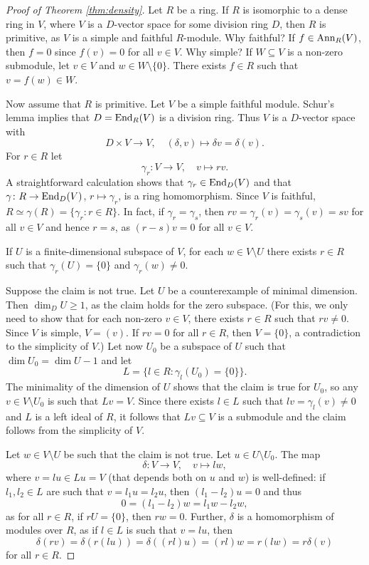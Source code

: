 \begin{proof}[Proof of Theorem \ref{thm:density}]
    Let $R$ be a ring. 
	If $R$ is isomorphic to a dense ring in $V$, where
	$V$ is a $D$-vector space for some division ring $D$, then $R$
	is primitive, as $V$ is a simple and faithful $R$-module. Why faithful? If 
	$f\in\operatorname{Ann}_R(V)$, then $f=0$ since $f(v)=0$ for all $v\in V$. Why simple? 
	If $W\subseteq V$ is a non-zero submodule, let $v\in V$ and $w\in
	W\setminus\{0\}$. There exists $f\in R$ such that $v=f(w)\in W$. 

	Now assume that $R$ is primitive. Let $V$ be a simple faithful module.
	Schur's lemma implies that $D=\operatorname{End}_R(V)$ is a division ring. Thus $V$ is
	a $D$-vector space with 
	\[
	D\times V\to V,\quad
	(\delta,v)\mapsto \delta v=\delta(v).
	\]
	For $r\in R$ let  
	\[
		\gamma_r\colon V\to V,\quad
		v\mapsto rv.
	\]
	A straightforward calculation shows that $\gamma_r\in\operatorname{End}_D(V)$ and that
    $\gamma\colon R\to\operatorname{End}_D(V)$,
	$r\mapsto\gamma_r$, is a ring homomorphism. Since $V$ is faithful,
	$R\simeq\gamma(R)=\{\gamma_r:r\in R\}$. In fact, if $\gamma_r=\gamma_s$, then 
	$rv=\gamma_r(v)=\gamma_s(v)=sv$ for all $v\in V$ and hence $r=s$, as
	$(r-s)v=0$ for all $v\in V$.

	\begin{claim}
		If $U$ is a finite-dimensional subspace of $V$, 
		for each $w\in V\setminus U$ there exists $r\in R$ such that 
		$\gamma_r(U)=\{0\}$ and $\gamma_r(w)\ne0$.
	\end{claim}

	Suppose the claim is not true. Let $U$ be a counterexample of minimal  
	dimension. Then
	$\dim_DU\geq1$, as the claim holds for the zero subspace. (For this, we only
        need to show that for each non-zero $v\in V$, there exists $r\in R$ such that $rv\ne 0$. 
        Since $V$ is simple, $V=(v)$. If $rv=0$ for all $r\in R$, then 
        $V=\{0\}$, a contradiction to the simplicity of $V$.) Let now 
	$U_0$ be a subspace of $U$ such that 
	$\dim U_0=\dim U-1$ and let 
	\[
		L=\{l\in R:\gamma_l(U_0)=\{0\}\}.
	\]
	The minimality of the dimension of $U$ shows that the claim is true for $U_0$, so
	any $v\in V\setminus U_0$ is such that $Lv=V$. Since there exists $l\in
	L$ such that $lv=\gamma_l(v)\ne 0$ and $L$ is a left ideal of $R$, it follows
	that $Lv\subseteq V$ is a submodule and the claim follows from the simplicity of
	$V$.
	
	Let $w\in V\setminus U$ be such that the claim is not true. Let $u\in
	U\setminus U_0$. The map  
	\[
		\delta\colon V\to V,\quad
		v\mapsto lw,
	\]
	where $v=lu\in Lu=V$ (that depends both on $u$ and $w$) 
	is well-defined: if $l_1,l_2\in L$ are such that 
	$v=l_1u=l_2u$, then $(l_1-l_2)u=0$ and thus 
	\[
		0=(l_1-l_2)w=l_1w-l_2w,
	\]
        as for all $r\in R$, if $rU=\{0\}$, then $rw=0$. 
	Further, $\delta$ is a homomorphism of modules over $R$, as if 
	$l\in L$ is such that $v=lu$, then 
	\[
		\delta(rv)=\delta(r(lu))=\delta( (rl)u)=(rl)w=r(lw)=r\delta(v)
	\]
	for all $r\in R$.


\end{proof}
